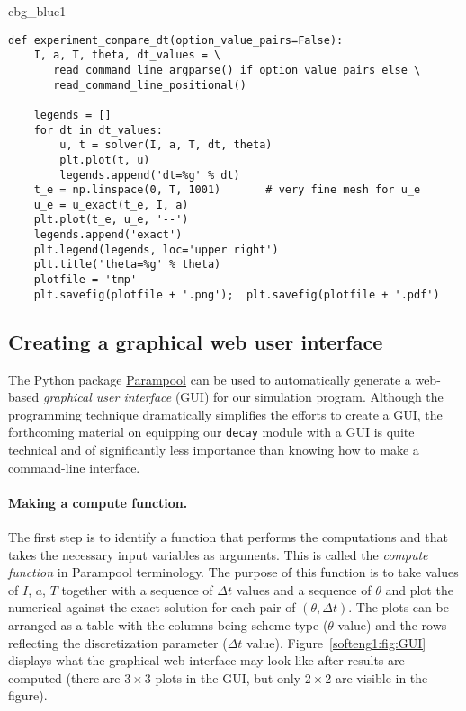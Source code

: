\documentclass[graybox,sectrefs,envcountresetchap,open=right,final]{svmonodo}
\newenvironment{_cod_tight}[1]{
   \def\FrameCommand{\colorbox{#1}}
   \FrameRule0.6pt\MakeFramed {\FrameRestore}\vskip3mm}
   {\vskip0mm\endMakeFramed}
\newenvironment{cod}[1]{
\bgroup\rmfamily
\fboxsep=0mm\relax
\begin{_cod_tight}{#1}
\list{}{\parsep=-2mm\parskip=0mm\topsep=0pt\leftmargin=2mm
\rightmargin=2\leftmargin\leftmargin=4pt\relax}
\item\relax}
{\endlist\end{_cod_tight}\egroup}
\begin{document}
\begin{cod}{cbg_blue1}\begin{Verbatim}[numbers=none,fontsize=\fontsize{9pt}{9pt},baselinestretch=0.95,xleftmargin=2mm]
def experiment_compare_dt(option_value_pairs=False):
    I, a, T, theta, dt_values = \ 
       read_command_line_argparse() if option_value_pairs else \ 
       read_command_line_positional()

    legends = []
    for dt in dt_values:
        u, t = solver(I, a, T, dt, theta)
        plt.plot(t, u)
        legends.append('dt=%g' % dt)
    t_e = np.linspace(0, T, 1001)       # very fine mesh for u_e
    u_e = u_exact(t_e, I, a)
    plt.plot(t_e, u_e, '--')
    legends.append('exact')
    plt.legend(legends, loc='upper right')
    plt.title('theta=%g' % theta)
    plotfile = 'tmp'
    plt.savefig(plotfile + '.png');  plt.savefig(plotfile + '.pdf')
\end{Verbatim}
\end{cod}
\noindent


\subsection{Creating a graphical web user interface}

The Python package \href{{https://github.com/hplgit/parampool}}{Parampool}
can be used to automatically generate a web-based \emph{graphical user interface}
(GUI) for our simulation program. Although the programming technique
dramatically simplifies the efforts to create a GUI, the forthcoming
material on equipping our \texttt{decay} module with a GUI is quite technical
and of significantly less importance than knowing how to make
a command-line interface.

\paragraph{Making a compute function.}
The first step is to identify a function
that performs the computations and that takes the necessary input
variables as arguments. This is called the \emph{compute function} in
Parampool terminology. The purpose of this function is to take
values of $I$, $a$, $T$ together with a sequence of $\Delta t$ values
and a sequence of $\theta$ and plot the numerical against the
exact solution for each pair of $(\theta, \Delta t)$.
The plots can be arranged as a table with the columns being scheme type
($\theta$ value) and the rows reflecting the discretization parameter
($\Delta t$ value). Figure~\ref{softeng1:fig:GUI} displays what the
graphical web interface may look like after results are computed
(there are $3\times 3$ plots in the GUI, but only $2\times 2$ are
visible in the figure).
\end{document}
